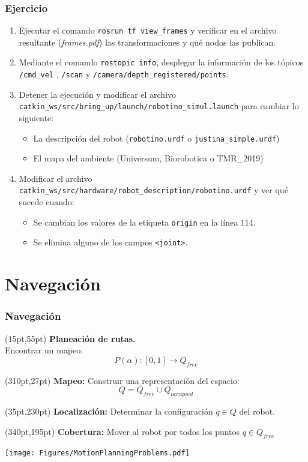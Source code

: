 \documentclass[10pt,spanish,aspectratio=1610]{beamer}
\begin{document}
\begin{frame}\frametitle{Ejercicio}
  \begin{enumerate}
  \item Ejecutar el comando \texttt{rosrun tf view\_frames} y verificar en el archivo resultante (\textit{frames.pdf}) las transformaciones y qué nodos las publican.
  \item Mediante el comando \texttt{rostopic info}, desplegar la información de los tópicos \texttt{/cmd\_vel} , \texttt{/scan} y \texttt{/camera/depth\_registered/points}.
  \item Detener la ejecución y modificar el archivo \texttt{catkin\_ws/src/bring\_up/launch/robotino\_simul.launch} para cambiar lo siguiente:
  \begin{itemize}
  \item La descripción del robot (\texttt{robotino.urdf} o \texttt{justina\_simple.urdf})
  \item El mapa del ambiente (Universum, Biorobotica o TMR\_2019)
  \end{itemize}
  \item Modificar el archivo \texttt{catkin\_ws/src/hardware/robot\_description/robotino.urdf} y ver qué sucede cuando:
  \begin{itemize}
  \item Se cambian los valores de la etiqueta \texttt{origin} en la línea 114.
  \item Se elimina alguno de los campos \texttt{<joint>}.
  \end{itemize}
\end{enumerate}
\end{frame}

\section{Navegación}
\begin{frame}\frametitle{Navegación}
  \begin{textblock*}{0.4\textwidth}(15pt,55pt)
    \textbf{ Planeación de rutas. }\\Encontrar un mapeo: 
    \[P(\alpha): [0,1] \rightarrow Q_{free}\]
  \end{textblock*}
  \begin{textblock*}{0.35\textwidth}(310pt,27pt)
    \textbf{Mapeo: }Construir una representación del espacio:
    \[Q = Q_{free} \cup Q_{occupied}\]
  \end{textblock*}
  \begin{textblock*}{0.35\textwidth}(35pt,230pt)
    \textbf{Localización: }Determinar la configuración $q\in Q$ del robot.
  \end{textblock*}
  \begin{textblock*}{0.25\textwidth}(340pt,195pt)
    \textbf{Cobertura: }Mover al robot por todos los puntos $q\in Q_{free}$
  \end{textblock*}
  \centering  \texttt{[image: Figures/MotionPlanningProblems.pdf]}
\end{frame}
\end{document}
